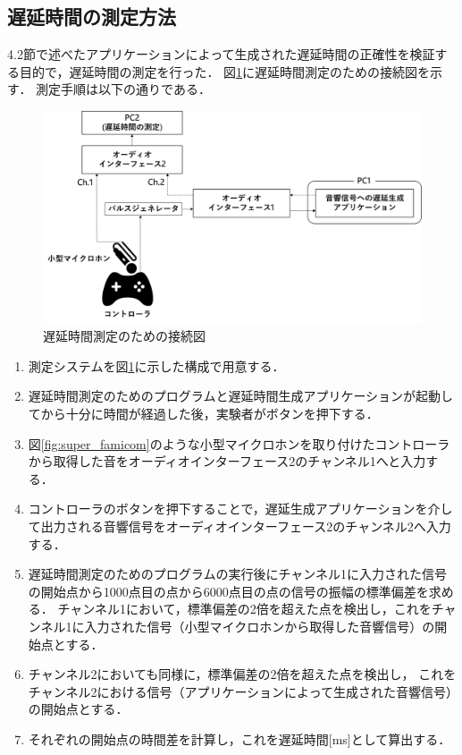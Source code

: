 \subsection{遅延時間の測定方法}
4.2節で述べたアプリケーションによって生成された遅延時間の正確性を検証する目的で，遅延時間の測定を行った．
図\ref{fig:delay_check}に遅延時間測定のための接続図を示す．
測定手順は以下の通りである．
\begin{figure}[tbp]
  \centering
  \includegraphics[scale=0.12]{figures/DelayCheck/DelayCheck_EX.pdf}
  \caption{遅延時間測定のための接続図}
  \label{fig:delay_check}
\end{figure}
\begin{enumerate}[leftmargin=*]
  \item 測定システムを図\ref{fig:delay_check}に示した構成で用意する．
  \item 遅延時間測定のためのプログラムと遅延時間生成アプリケーションが起動してから十分に時間が経過した後，実験者がボタンを押下する．
  \item 図\ref{fig:super_famicom}のような小型マイクロホンを取り付けたコントローラから取得した音をオーディオインターフェース2のチャンネル1へと入力する．
  \item コントローラのボタンを押下することで，遅延生成アプリケーションを介して出力される音響信号をオーディオインターフェース2のチャンネル2へ入力する．
  \item 遅延時間測定のためのプログラムの実行後にチャンネル1に入力された信号の開始点から1000点目の点から6000点目の点の信号の振幅の標準偏差を求める．
  チャンネル1において，標準偏差の2倍を超えた点を検出し，これをチャンネル1に入力された信号（小型マイクロホンから取得した音響信号）の開始点とする．
  \item チャンネル2においても同様に，標準偏差の2倍を超えた点を検出し，
  これをチャンネル2における信号（アプリケーションによって生成された音響信号）の開始点とする．
  \item それぞれの開始点の時間差を計算し，これを遅延時間[ms]として算出する．
\end{enumerate}
